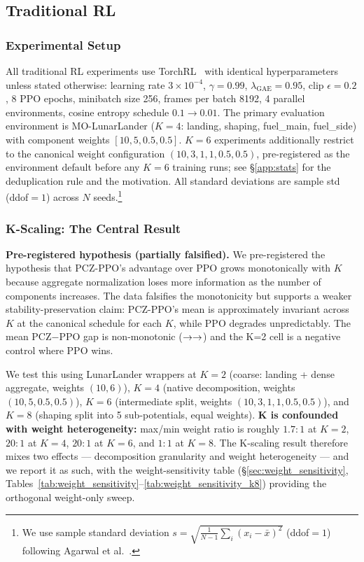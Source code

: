 \documentclass[11pt,a4paper]{article}
\DeclareRobustCommand{\cnum}[1]{\unskip}
\begin{document}
\subsection{Traditional RL}
\label{sec:traditional_rl}

\subsubsection{Experimental Setup}

All traditional RL experiments use TorchRL~\cite{borghesi2024torchrl} with identical hyperparameters unless stated otherwise: learning rate $3 \times 10^{-4}$, $\gamma = 0.99$, $\lambda_{\text{GAE}} = 0.95$, clip $\epsilon = 0.2$, 8 PPO epochs, minibatch size 256, frames per batch 8192, 4 parallel environments, cosine entropy schedule $0.1 \to 0.01$. The primary evaluation environment is MO-LunarLander ($K{=}4$: landing, shaping, fuel\_main, fuel\_side) with component weights $[10, 5, 0.5, 0.5]$. $K{=}6$ experiments additionally restrict to the canonical weight configuration $(10, 3, 1, 1, 0.5, 0.5)$, pre-registered as the environment default before any $K{=}6$ training runs; see §\ref{app:stats} for the deduplication rule and the motivation. All standard deviations are sample std (ddof${}=1$) across $N$ seeds.\footnote{We use sample standard deviation $s = \sqrt{\frac{1}{N-1}\sum_i(x_i - \bar{x})^2}$ (ddof${}=1$) following Agarwal et al.~\cite{agarwal2021rliable}.}

\subsubsection{K-Scaling: The Central Result}

\textbf{Pre-registered hypothesis (partially falsified).} We pre-registered the hypothesis that PCZ-PPO's advantage over PPO grows monotonically with $K$ because aggregate normalization loses more information as the number of components increases. The data falsifies the monotonicity but supports a weaker stability-preservation claim: PCZ-PPO's mean is approximately invariant across $K$ at the canonical schedule for each $K$, while PPO degrades unpredictably. The mean PCZ$-$PPO gap is non-monotonic ($\cnum{k4_delta} \to \cnum{k6_delta} \to \cnum{k8_delta}$) and the K=2 cell is a negative control where PPO wins.

We test this using LunarLander wrappers at $K{=}2$ (coarse: landing + dense aggregate, weights $(10,6)$), $K{=}4$ (native decomposition, weights $(10,5,0.5,0.5)$), $K{=}6$ (intermediate split, weights $(10,3,1,1,0.5,0.5)$), and $K{=}8$ (shaping split into 5 sub-potentials, equal weights). \textbf{K is confounded with weight heterogeneity:} max/min weight ratio is roughly $1.7\!:\!1$ at $K{=}2$, $20\!:\!1$ at $K{=}4$, $20\!:\!1$ at $K{=}6$, and $1\!:\!1$ at $K{=}8$. The K-scaling result therefore mixes two effects --- decomposition granularity and weight heterogeneity --- and we report it as such, with the weight-sensitivity table (§\ref{sec:weight_sensitivity}, Tables~\ref{tab:weight_sensitivity}--\ref{tab:weight_sensitivity_k8}) providing the orthogonal weight-only sweep.
\end{document}

